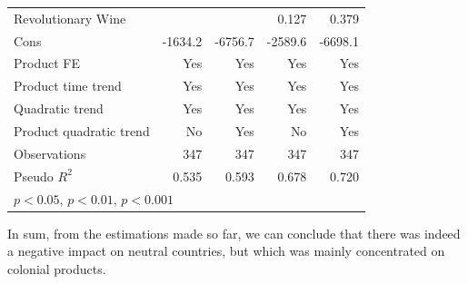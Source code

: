 \documentclass[12pt,a4paper,titlepage]{article}
\begin{document}
\begin{table}[htbp]
\begin{tabular}{l*{4}{D{.}{.}{-1}}}
Revolutionary Wine  &                     &                     &       0.127         &       0.379\sym{*}  \\
Cons                &     -1634.2\sym{***}&     -6756.7\sym{***}&     -2589.6\sym{***}&     -6698.1\sym{***}\\
Product FE          &         Yes         &         Yes         &         Yes         &         Yes         \\
Product time trend  &         Yes         &         Yes         &         Yes         &         Yes         \\
Quadratic trend     &         Yes         &         Yes         &         Yes         &         Yes         \\
Product quadratic trend&          No         &         Yes         &          No         &         Yes         \\
\midrule
Observations        &         347         &         347         &         347         &         347         \\
Pseudo \(R^{2}\)    &       0.535         &       0.593         &       0.678         &       0.720         \\
\bottomrule
{}\\
\end{tabular}
\end{table}

In sum, from the estimations made so far, we can conclude that there was indeed a negative impact on neutral countries, but which was mainly concentrated on colonial products. 
\end{document}
